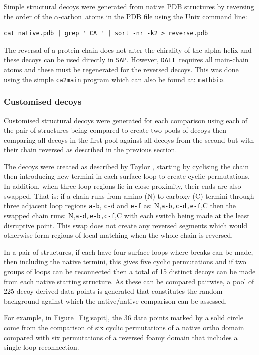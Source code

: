 \documentclass[12pt]{article}
\newcommand{\Fig}[1]{Figure~\ref{Fig:#1}}
\newcommand{\CA}{$\alpha$-carbon}
\newcommand{\3}{$3_{10}$}
\newcommand{\SAP}{{\tt SAP}}
\newcommand{\DALI}{{\tt DALI}}
\begin{document}
Simple structural decoys were generated from native PDB structures by reversing the order
of the \CA\ atoms in the PDB file using the Unix command line:
\begin{verbatim}
cat native.pdb | grep ' CA ' | sort -nr -k2 > reverse.pdb
\end{verbatim}
The reversal of a protein chain does not alter the chirality of the alpha helix and
these decoys can be used directly in \SAP.   However, \DALI\ requires all main-chain atoms
and these must be regenerated for the reversed decoys.   This was done using the simple
{\tt ca2main} program which can also be found at: {\tt  mathbio}.

\subsubsection{Customised decoys}

Customised structural decoys were generated for each comparison using each of the
pair of structures being compared to create two pools of decoys then comparing all
decoys in the first pool against all decoys from the second but with their chain
reversed as described in the previous section.

The decoys were created as described by Taylor \cite{TaylorWR06a}, starting by cyclising the
chain then introducing new termini in each surface loop to create cyclic permutations.
In addition, when three loop regions lie in close proximity, their ends are also 
swapped.   That is: if a chain runs from amino (N) to carboxy (C) termini through
three adjacent loop regions {\tt a-b}, {\tt c-d} and {\tt e-f} as: N,{\tt a-b,c-d,e-f},C
then the swapped chain runs: N,{\tt a-d,e-b,c-f},C with each switch being made at the
least disruptive point.   This swap does not create any reversed segments which would
otherwise form regions of local matching when the whole chain is reversed.

In a pair of structures, if each have four surface loops where breaks can be made, then
including the native termini, this gives five cyclic permutations and if two groups of 
loops can be reconnected then a total of 15 distinct decoys can be made from each native
starting structure.   As these can be compared pairwise, a pool of 225 decoy derived
data points is generated that constitutes the random background against which the native/native
comparison can be assessed.

For example, in \Fig{sapit}, the 36 data
points marked by a solid circle come from the comparison of six cyclic permutations of a 
native ortho domain compared with six permutations of a reversed foamy domain that includes
a single loop reconnection.  
\end{document}
